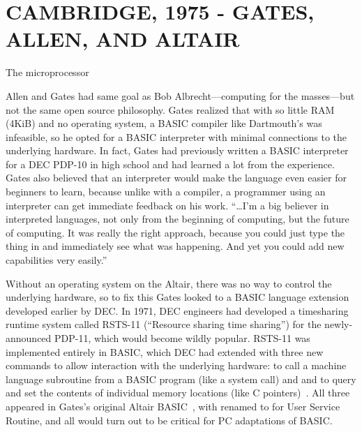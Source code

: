 
\section{CAMBRIDGE, 1975 - GATES, ALLEN, AND ALTAIR}

\begin{milestone}{The microprocessor}

\end{milestone}



Allen and Gates had same goal as Bob Albrecht---computing for the
masses---but not the 
same open source philosophy.  Gates realized that with so little RAM
(4KiB)  and no operating system, a BASIC compiler like Dartmouth's was
infeasible, so he opted for a BASIC interpreter with minimal 
connections to the underlying hardware.
In fact, Gates had
previously written a BASIC interpreter for  a DEC PDP-10 in high school and
had learned a lot from the experience.
Gates also believed that an interpreter would make the language even
easier for beginners to learn, because unlike with a compiler, a
programmer using an interpreter can get immediate feedback on his work.
``\ldots I'm a big believer in interpreted languages,
not only from the beginning of computing, but the future of
computing. It was really the right approach, because you could just type
the thing in and immediately see what was happening. And yet you could
add new capabilities very easily.'' ~\cite{smithsonian_interview}

Without an operating system on the Altair, there was no way to control
the underlying hardware, so to fix this Gates
looked to a BASIC language extension developed earlier by DEC.
In 1971, DEC engineers had developed a timesharing runtime system called
RSTS-11 (``Resource sharing time sharing'') for the newly-announced
PDP-11, which would become wildly popular.
RSTS-11 was implemented entirely in BASIC, 
which DEC had
extended with three new commands to allow interaction with the underlying
hardware:  to call a machine language subroutine from a BASIC
program (like a system call) and 
 and  to query and set the contents of individual memory
locations (like C pointers)~\cite[pp.~204--205]{ceruzzi}.
All three appeared in Gates's original Altair
BASIC~\cite{smithsonian_interview}, with  
renamed to  for User Service Routine, and
all would turn out to be critical for PC adaptations of 
BASIC. 

